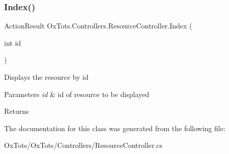 \subsubsection{\texorpdfstring{Index()}{Index()}}
{\footnotesize\ttfamily Action\+Result Ox\+Tots.\+Controllers.\+Resource\+Controller.\+Index (\begin{DoxyParamCaption}\item[{int}]{id }\end{DoxyParamCaption})\hspace{0.3cm}{\ttfamily [inline]}}



Displays the resource by id 


\begin{DoxyParams}{Parameters}
{\em id} & id of resource to be displayed\\
\hline
\end{DoxyParams}
\begin{DoxyReturn}{Returns}

\end{DoxyReturn}


The documentation for this class was generated from the following file\+:\begin{DoxyCompactItemize}
\item 
Ox\+Tots/\+Ox\+Tots/\+Controllers/Resource\+Controller.\+cs\end{DoxyCompactItemize}
